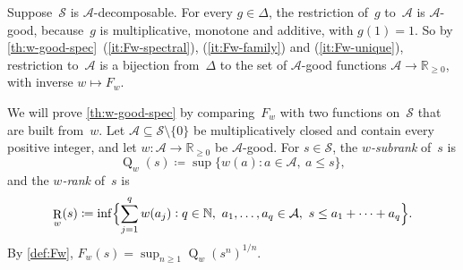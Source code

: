\documentclass[11pt,letterpaper]{article}
\DeclareMathOperator{\subrank}{Q}
\DeclareMathOperator{\tensorrank}{R}
\newcommand{\RR}{\mathbb{R}}
\newcommand{\NN}{\mathbb{N}}
\begin{document}
Suppose~$\mathcal{S}$ is $\mathcal{A}$-decomposable. For every $g \in \Delta$, the restriction of~$g$ to~$\mathcal{A}$ is $\mathcal{A}$-good, because~$g$ is multiplicative, monotone and additive, with $g(1) = 1$. So by \cref{th:w-good-spec}~(\ref{it:Fw-spectral}), (\ref{it:Fw-family}) and (\ref{it:Fw-unique}), restriction to~$\mathcal{A}$ is a bijection from~$\Delta$ to the set of $\mathcal{A}$-good functions $\mathcal{A} \to \RR_{\geq0}$, with inverse $w \mapsto F_w$.

We will prove \cref{th:w-good-spec} by comparing~$F_w$ with two functions on~$\mathcal{S}$ that are built from~$w$. Let $\mathcal{A} \subseteq \mathcal{S} \setminus \{0\}$ be multiplicatively closed and contain every positive integer, and let $w : \mathcal{A} \to \RR_{\geq0}$ be $\mathcal{A}$-good. For $s \in \mathcal{S}$, the \emph{$w$-subrank} of~$s$ is
\[
\subrank_w(s) \coloneqq \sup \{ w(a) : a \in \mathcal{A},\ a \leq s \},
\]
and the \emph{$w$-rank} of~$s$ is
\[
\tensorrank_w(s) \coloneqq \inf \Bigl\{ \sum_{j=1}^q w(a_j) : q \in \NN,\ a_1, \ldots, a_q \in \mathcal{A},\ s \leq a_1 + \cdots + a_q \Bigr\}.
\]
By \cref{def:Fw}, $F_w(s) = \sup_{n \geq 1} \subrank_w(s^n)^{1/n}$.
\end{document}

